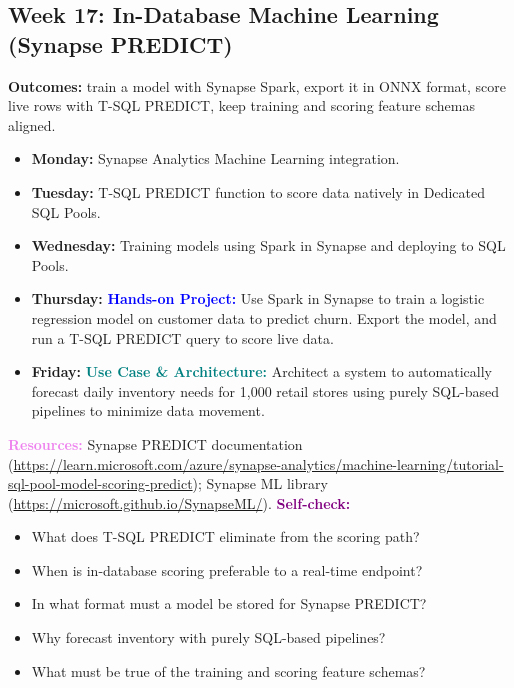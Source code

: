 \documentclass[11pt, a4paper]{article}
\newcommand{\project}[1]{\vspace{1mm}\noindent\textbf{\textcolor{blue}{Hands-on Project:}} #1}
\newcommand{\usecase}[1]{\vspace{1mm}\noindent\textbf{\textcolor{teal}{Use Case \& Architecture:}} #1}
\newcommand{\dayitem}[2]{\item \textbf{#1:} #2}
\newcommand{\resources}[1]{\vspace{1mm}\noindent\textbf{\textcolor{violet}{Resources:}} #1}
\newcommand{\selfcheck}[1]{\vspace{1mm}\noindent\textbf{\textcolor{purple}{Self-check:}} #1}
\begin{document}
\subsection*{Week 17: In-Database Machine Learning (Synapse PREDICT)}
\par\noindent\textbf{Outcomes:} train a model with Synapse Spark, export it in ONNX format, score live rows with T-SQL PREDICT, keep training and scoring feature schemas aligned.
\begin{itemize}[label=-]
    \dayitem{Monday}{Synapse Analytics Machine Learning integration.}
    \dayitem{Tuesday}{T-SQL PREDICT function to score data natively in Dedicated SQL Pools.}
    \dayitem{Wednesday}{Training models using Spark in Synapse and deploying to SQL Pools.}
    \dayitem{Thursday}{\project{Use Spark in Synapse to train a logistic regression model on customer data to predict churn. Export the model, and run a T-SQL PREDICT query to score live data.}}
    \dayitem{Friday}{\usecase{Architect a system to automatically forecast daily inventory needs for 1,000 retail stores using purely SQL-based pipelines to minimize data movement.}}
\end{itemize}
\resources{Synapse PREDICT documentation (\url{https://learn.microsoft.com/azure/synapse-analytics/machine-learning/tutorial-sql-pool-model-scoring-predict}); Synapse ML library (\url{https://microsoft.github.io/SynapseML/}).}
\selfcheck{\begin{itemize}[label=-, itemsep=0pt]
    \item What does T-SQL PREDICT eliminate from the scoring path?
    \item When is in-database scoring preferable to a real-time endpoint?
    \item In what format must a model be stored for Synapse PREDICT?
    \item Why forecast inventory with purely SQL-based pipelines?
    \item What must be true of the training and scoring feature schemas?
\end{itemize}}
\end{document}
